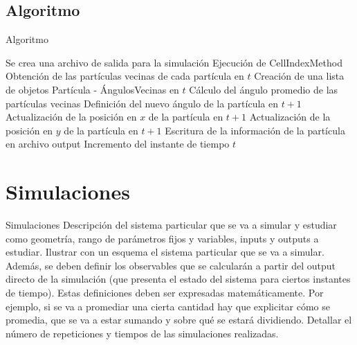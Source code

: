 \documentclass{beamer}
\begin{document}
    \subsection{Algoritmo}
    \begin{frame}{Algoritmo}
        \begin{algorithmic}[1]
            \small
            \State Se crea una archivo de salida para la simulación
                \State Ejecución de CellIndexMethod
                \State Obtención de las partículas vecinas de cada partícula en $t$
                \State Creación de una lista de objetos Partícula - ÁngulosVecinas en $t$
                    \State Cálculo del ángulo promedio de las partículas vecinas
                    \State Definición del nuevo ángulo de la partícula en $t+1$
                    \State Actualización de la posición en $x$ de la partícula en $t+1$
                    \State Actualización de la posición en $y$ de la partícula en $t+1$
                    \State Escritura de la información de la partícula en archivo output
                \EndFor
                \State Incremento del instante de tiempo $t$
            \EndWhile
        \end{algorithmic}
        \label{alg:algorithm}

    \end{frame}


    \section{Simulaciones}

    \begin{frame}{Simulaciones}
        Descripción del sistema particular que se va a simular y estudiar como
        geometría, rango de parámetros fijos y variables, inputs y outputs a estudiar. Ilustrar con un
        esquema el sistema particular que se va a simular.
        Además, se deben definir los observables que se calcularán a partir del output directo de la
        simulación (que presenta el estado del sistema para ciertos instantes de tiempo). Estas
        definiciones deben ser expresadas matemáticamente. Por ejemplo, si se va a promediar una cierta
        cantidad hay que explicitar cómo se promedia, que se va a estar sumando y sobre qué se estará
        dividiendo.
        Detallar el número de repeticiones y tiempos de las simulaciones realizadas.
    \end{frame}
\end{document}
